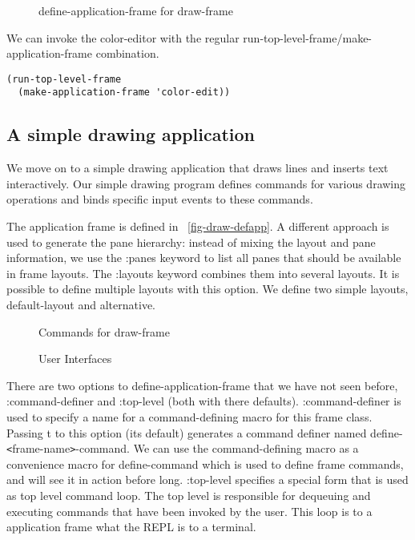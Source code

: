 \documentclass[twocolumn,a4paper]{article}
\newcommand {\code}[1]{{\sffamily #1}}
\let\class\code
\let\method\code
\let\constant\code
\let\macro\code
\let\keyword\code
\begin{document}
\begin{figure*}[t] \lstset{style=framestyle}

\caption{define-application-frame for
\class{draw-frame}}\label{fig-draw-defapp}\label{fig-draw-handlerepaint}
\end{figure*}

We can invoke the color-editor with the regular
\method{run-top-level-frame}/\method{make-application-frame}
combination.  
\lstset{style=inlinestyle}
\begin{lstlisting}
(run-top-level-frame 
  (make-application-frame 'color-edit))
\end{lstlisting}


\subsection{A simple drawing application}

We move on to a simple drawing application that draws
lines and inserts text interactively. Our simple drawing program
defines commands for various drawing operations and binds specific
input events to these commands.

The application frame is defined in
\figurename~\ref{fig-draw-defapp}. A different approach is used to
generate the pane hierarchy: instead of mixing the layout and pane
information, we use the \keyword{:panes} keyword to list all panes
that should be available in frame layouts. The \keyword{:layouts}
keyword combines them into several layouts. It is possible to define
multiple layouts with this option. We define two simple layouts,
\code{default-layout} and \code{alternative}.

\begin{figure*}[t]
\lstset{style=framestyle}

\caption{Commands for \class{draw-frame}}\label{fig-draw-commands}
\end{figure*}

\begin{figure*}
\lstset{style=framestyle}

\caption{User Interfaces}\label{fig-draw-interfacing}
\end{figure*}

There are two options to \macro{define-application-frame} that we have
not seen before, \keyword{:command-definer} and \keyword{:top-level}
(both with there defaults). \keyword{:command-definer} is used to
specify a name for a command-defining macro for this frame
class. Passing \constant{t} to this option (its default) generates a
command definer named
\macro{define-\texttt{<}frame-name\texttt{>}-command}. We can use the
command-defining macro as a convenience macro for
\method{define-command} which is used to define frame commands, and 
will see it in action before long. \keyword{:top-level} specifies a
special form that is used as top level command loop. The top level is
responsible for dequeuing and executing commands that have been
invoked by the user. This loop is to a application frame what the REPL
is to a terminal.
\end{document}
